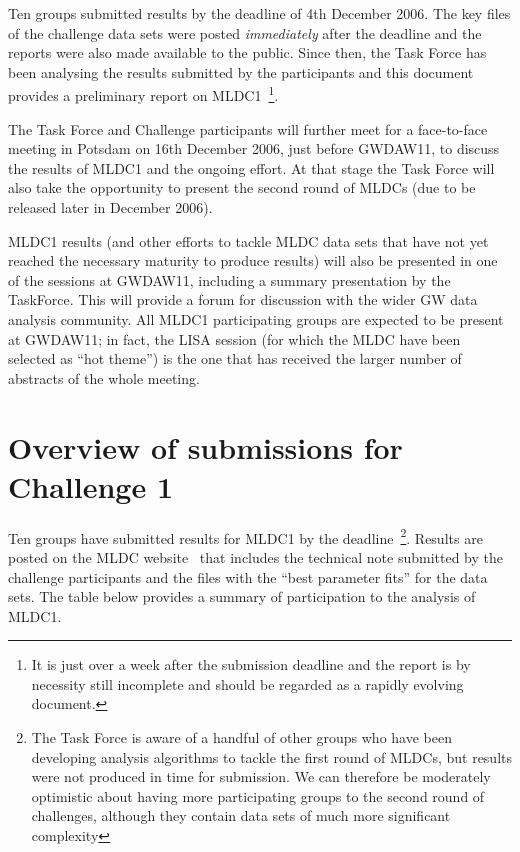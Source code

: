 \documentclass[11pt]{article}
\begin{document}
Ten groups submitted results by the deadline of 4th December 2006. The key files of the challenge data sets were posted {\em immediately} after the deadline and the reports were also made available to the public. Since then, the Task Force has been analysing the results submitted by the participants and this document provides a preliminary report on MLDC1~\footnote{It is just over a week after the submission deadline and the report is by necessity still incomplete and should be regarded as a rapidly evolving document.}. 

The Task Force and Challenge participants will further meet for a face-to-face meeting in Potsdam on 16th December 2006, just before GWDAW11, to discuss the results of MLDC1 and the ongoing effort. At that stage the Task Force will also take the opportunity to present the second round of MLDCs (due to be released later in December 2006).

MLDC1 results (and other efforts to tackle MLDC data sets that have not yet reached the necessary maturity to produce results) will also be presented in one of the sessions at GWDAW11, including a summary presentation by the TaskForce. This will provide a forum for discussion with the wider GW data analysis community. All MLDC1 participating groups are expected to be present at GWDAW11; in fact, the LISA session (for which the MLDC have been selected as ``hot theme'') is the one that has received the larger number of abstracts of the whole meeting.

\section{Overview of submissions for Challenge 1}

Ten groups have submitted results for MLDC1 by the deadline~\footnote{The Task Force is aware of a handful of other groups who have been developing analysis algorithms to tackle the first round of MLDCs, but results were not produced in time for submission. We can therefore be moderately optimistic about having more participating groups to the second round of challenges, although they contain data sets of much more significant complexity}. Results are posted on the MLDC website~\cite{mldc-results} that includes the technical note submitted by the challenge participants and the files with the ``best parameter fits'' for the data sets. The table below provides a summary of participation to the analysis of MLDC1.
\end{document}
